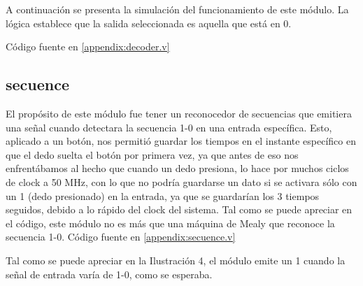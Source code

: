\documentclass[a4paper,10pt]{article}
\begin{document}
A continuación se presenta la simulación del funcionamiento de este módulo. La
lógica establece que la salida seleccionada es aquella que está en 0.

Código fuente en \ref{appendix:decoder.v}

\subsection{secuence}
El propósito de este módulo fue tener un reconocedor de secuencias que emitiera
una señal cuando detectara la secuencia 1-0 en una entrada específica. Esto,
aplicado a un botón, nos permitió guardar los tiempos en el instante específico
en que el dedo suelta el botón por primera vez, ya que antes de eso nos
enfrentábamos al hecho que cuando un dedo presiona, lo hace por muchos ciclos
de clock a 50 MHz, con lo que no podría guardarse un dato si se activara sólo
con un 1 (dedo presionado) en la entrada, ya que se guardarían los 3 tiempos
seguidos, debido a lo rápido del clock del sistema. Tal como se puede apreciar
en el código, este módulo no es más que una máquina de Mealy que reconoce la
secuencia 1-0.
Código fuente en \ref{appendix:secuence.v}


Tal como se puede apreciar en la Ilustración 4, el módulo emite un 1 cuando la
señal de entrada varía de 1-0, como se esperaba.
\end{document}
